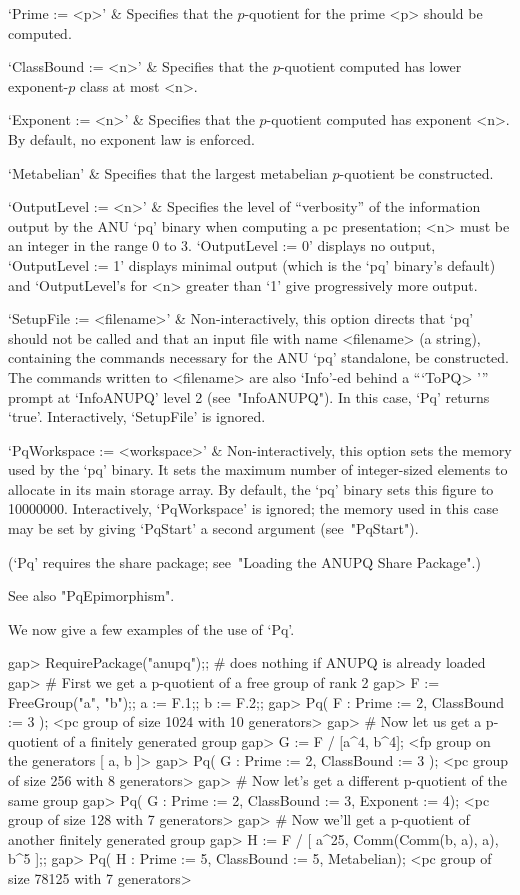 \beginitems

`Prime := <p>' & 
Specifies that the $p$-quotient for the prime <p> should be computed.

`ClassBound := <n>' & 
Specifies that the $p$-quotient computed has lower exponent-$p$ class  at
most <n>.

`Exponent := <n>' & 
Specifies that the $p$-quotient computed has exponent <n>. By default, no
exponent law is enforced.

`Metabelian' & 
Specifies that the largest metabelian $p$-quotient be constructed.

`OutputLevel := <n>' &
Specifies the level of ``verbosity'' of the information output by the ANU
`pq' binary when computing a pc presentation; <n> must be an  integer  in
the range 0 to 3. `OutputLevel := 0' displays no output, `OutputLevel  :=
1' displays minimal output (which  is  the  `pq'  binary's  default)  and
`OutputLevel's for <n> greater than `1' give progressively  more  output.

`SetupFile := <filename>' &
Non-interactively, this option directs that `pq' should not be called and
that an input file  with  name  <filename>  (a  string),  containing  the
commands necessary for the  ANU  `pq'  standalone,  be  constructed.  The
commands written to <filename> are also `Info'-ed behind  a  ```ToPQ> '''
prompt at `InfoANUPQ' level  2  (see~"InfoANUPQ").  In  this  case,  `Pq'
returns `true'. Interactively, `SetupFile' is ignored.

`PqWorkspace := <workspace>' &
Non-interactively, this option sets the memory used by the  `pq'  binary.
It sets the maximum number of integer-sized elements to allocate  in  its
main storage array. By default, the  `pq'  binary  sets  this  figure  to
10000000. Interactively, `PqWorkspace' is ignored;  the  memory  used  in
this  case  may  be  set  by   giving   `PqStart'   a   second   argument
(see~"PqStart").

\enditems

(`Pq' requires the {\ANUPQ} share package; see~"Loading  the  ANUPQ  Share
Package".)

See also "PqEpimorphism".

We now give a few examples of the use of `Pq'.

\beginexample
gap> RequirePackage("anupq");; # does nothing if ANUPQ is already loaded
gap> # First we get a p-quotient of a free group of rank 2
gap> F := FreeGroup("a", "b");; a := F.1;; b := F.2;;
gap> Pq( F : Prime := 2, ClassBound := 3 ); 
<pc group of size 1024 with 10 generators>
gap> # Now let us get a p-quotient of a finitely generated group
gap> G := F / [a^4, b^4];
<fp group on the generators [ a, b ]>
gap> Pq( G : Prime := 2, ClassBound := 3 ); 
<pc group of size 256 with 8 generators>
gap> # Now let's get a different p-quotient of the same group
gap> Pq( G : Prime := 2, ClassBound := 3, Exponent := 4); 
<pc group of size 128 with 7 generators>
gap> # Now we'll get a p-quotient of another finitely generated group 
gap> H := F / [ a^25, Comm(Comm(b, a), a), b^5 ];;
gap> Pq( H : Prime := 5, ClassBound := 5, Metabelian);
<pc group of size 78125 with 7 generators>
\endexample

